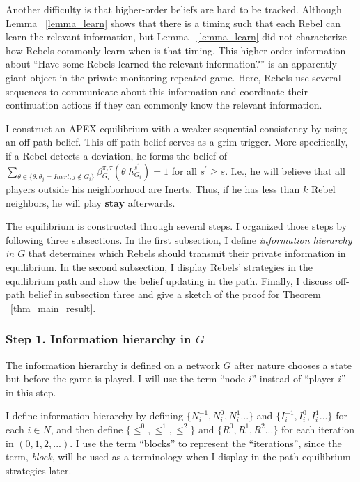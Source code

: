 \documentclass[12pt,letterpaper]{article}
\newtheorem*{main result}{Main Result}
\theoremstyle{definition}
\theoremstyle{remark}
\theoremstyle{claim}
\begin{document}
Another difficulty is that higher-order beliefs are hard to be tracked.  Although Lemma ~\ref{lemma_learn} shows that there is a timing such that each Rebel can learn the relevant information, but Lemma ~\ref{lemma_learn}  did not characterize how Rebels commonly learn when is that timing. This higher-order information about ``Have some Rebels learned the relevant information?'' is an apparently giant object in the private monitoring repeated game. Here, Rebels use several sequences to communicate about this information and coordinate their continuation actions if they can commonly know the relevant information.

I construct an APEX equilibrium with a weaker sequential consistency by using an off-path belief. This off-path belief serves as  a grim-trigger. More specifically, if a Rebel detects a deviation, he forms the belief of $\sum_{\theta \in \{\theta:\theta_j=Inert,j\notin G_i\}}\beta^{\pi,\tau}_{G_i}({\theta}|h^{s^{'}}_{G_i})=1$ for all $s^{'}\geq s$. I.e., he will believe that all players outside his neighborhood are Inerts. Thus, if he has less than $k$ Rebel neighbors, he will play \textbf{stay} afterwards. 

The equilibrium is constructed through several steps. I organized those steps by following three subsections. In the first subsection, I define \textit{information hierarchy in $G$} that determines which Rebels should transmit their private information in equilibrium. In the second subsection, I display Rebels' strategies in the equilibrium path and show the belief updating in the path. Finally, I discuss off-path belief in subsection three and give a sketch of the proof for Theorem ~\ref{thm_main_result}. 

\subsubsection{Step 1. Information hierarchy in $G$}

The information hierarchy is defined on a network $G$ after nature chooses a state but before the game is played. I will use the term ``node $i$'' instead of ``player $i$'' in this step. 

I define information hierarchy by defining $\{N^{-1}_i,N^{0}_i, N^{1}_i...\}$ and $\{I^{-1}_i,I^{0}_i, I^{1}_i...\}$ for each $i\in N$, and then define $\{\leq^0, \leq^1, \leq^2\}$ and $\{R^0,R^{1}, R^{2}...\}$ for each iteration in $(0,1,2,...)$. I use the term ``blocks'' to represent the ``iterations'', since the term, \textit{block}, will be used as a terminology when I display in-the-path equilibrium strategies later. 
\end{document}

